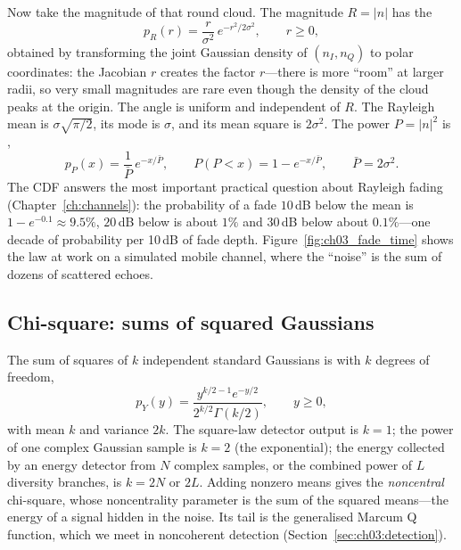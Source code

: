 Now take the magnitude of that round cloud. The magnitude $R=|n|$ has the 
\begin{equation}
p_R(r)=\frac{r}{\sigma^2}\,e^{-r^2/2\sigma^2},\qquad r\ge0,
\label{eq:ch03:rayleigh}
\end{equation}
obtained by transforming the joint Gaussian density of $(n_I,n_Q)$ to polar coordinates: the
Jacobian $r$ creates the factor $r$---there is more ``room'' at larger radii, so very small
magnitudes are rare even though the density of the cloud peaks at the origin. The angle is uniform
and independent of $R$. The Rayleigh mean is $\sigma\sqrt{\pi/2}$, its mode is $\sigma$, and its mean
square is $2\sigma^2$. The power $P=|n|^2$ is ,
\begin{equation}
p_P(x)=\frac{1}{\bar P}\,e^{-x/\bar P},\qquad P(P<x)=1-e^{-x/\bar P},\qquad \bar P=2\sigma^2 .
\label{eq:ch03:expo}
\end{equation}
The CDF answers the most important practical question about Rayleigh fading
(Chapter~\ref{ch:channels}): the probability of a fade $10$\,dB below the mean is
$1-e^{-0.1}\approx9.5\%$, $20$\,dB below is about $1\%$ and $30$\,dB below about $0.1\%$---one decade
of probability per 10\,dB of fade depth. Figure~\ref{fig:ch03_fade_time} shows the law at work on a
simulated mobile channel, where the ``noise'' is the sum of dozens of scattered echoes.


\subsection{Chi-square: sums of squared Gaussians}

The sum of squares of $k$ independent standard Gaussians is  with $k$ degrees of
freedom,
\begin{equation}
p_Y(y)=\frac{y^{k/2-1}e^{-y/2}}{2^{k/2}\Gamma(k/2)},\qquad y\ge0,
\label{eq:ch03:chisq}
\end{equation}
with mean $k$ and variance $2k$. The square-law detector output is $k=1$; the power of one complex
Gaussian sample is $k=2$ (the exponential); the energy collected by an energy detector from $N$
complex samples, or the combined power of $L$ diversity branches, is $k=2N$ or $2L$. Adding nonzero
means gives the \emph{noncentral} chi-square, whose noncentrality parameter is the sum of the
squared means---the energy of a signal hidden in the noise. Its tail is the generalised Marcum Q
function, which we meet in noncoherent detection (Section~\ref{sec:ch03:detection}).

